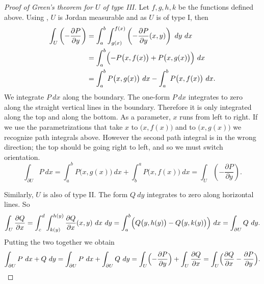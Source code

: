 \begin{proof}[Proof of Green's theorem for $U$ of type III]
Let $f,g,h,k$ be the functions defined above.
Using ,
$U$ is Jordan measurable and as $U$ is of type I\@, then
\begin{equation*}
\begin{split}
\int_U 
\left(- \frac{\partial P}{\partial y} \right)
& =
\int_a^b \int_{g(x)}^{f(x)}
\left(- \frac{\partial P}{\partial y} (x,y) \right)
~ dy ~ dx 
\\
& =
\int_a^b \Bigl(
- P\bigl(x,f(x)\bigr) +
P\bigl(x,g(x)\bigr)
\Bigr) ~ dx
\\
& =
\int_a^b P\bigl(x,g(x)\bigr) ~ dx 
-
\int_a^b P\bigl(x,f(x)\bigr) ~ dx .
\end{split}
\end{equation*}
We integrate $P~dx$ along the boundary.
The one-form $P~dx$ integrates to zero 
along the straight vertical lines in the boundary.  Therefore it is
only
integrated along the top and along the bottom.  As a parameter,
$x$ runs from left to right.  If we use the parametrizations that take $x$
to $\bigl(x,f(x)\bigr)$ and to
$\bigl(x,g(x)\bigr)$ we recognize path integrals above.  However the second
path integral is in the wrong direction; the top should be going right to
left, and so we must switch orientation.
\begin{equation*}
\int_{\partial U} P ~ dx
=
\int_a^b P\bigl(x,g(x)\bigr) ~ dx 
+
\int_b^a P\bigl(x,f(x)\bigr) ~ dx
=
\int_U 
\left(- \frac{\partial P}{\partial y} \right) .
\end{equation*}

Similarly, $U$ is also of type II\@.  The form $Q~dy$ integrates to zero along
horizontal lines.   So
\begin{equation*}
\int_U 
\frac{\partial Q}{\partial x}
=
\int_c^d \int_{k(y)}^{h(y)}
\frac{\partial Q}{\partial x}(x,y)
~ dx ~ dy 
=
\int_a^b \Bigl(
Q\bigl(y,h(y)\bigr) 
-
Q\bigl(y,k(y)\bigr)
\Bigr) ~ dx 
=
\int_{\partial U} Q ~ dy .
\end{equation*}
Putting the two together we obtain
\begin{equation*}
\int_{\partial U} P~ dx + Q ~ dy 
=
\int_{\partial U} P~ dx + \int_{\partial U} Q ~ dy 
=
\int_U 
\Bigl(-\frac{\partial P}{\partial y}\Bigr)
+
\int_U 
\frac{\partial Q}{\partial x}
=
\int_U 
\Bigl(
\frac{\partial Q}{\partial x}
-\frac{\partial P}{\partial y}
\Bigr) . \qedhere
\end{equation*}
\end{proof}

